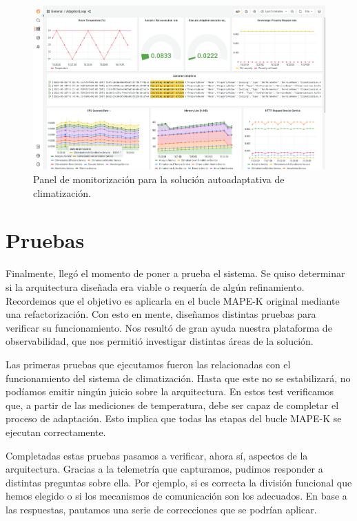 \begin{landscape}

  \begin{figure}[htb]
    \centering
    \includegraphics[scale=0.37]{cap_despliegue/images/Grafana-panel-monitorizacion}
    \caption{Panel de monitorización para la solución autoadaptativa de climatización.}
    \label{fig:grafana-panel-monitorizacion}
  \end{figure}

\end{landscape}


\section{Pruebas}

Finalmente, llegó el momento de poner a prueba el sistema. Se quiso determinar si la arquitectura diseñada era viable o requería de algún refinamiento. Recordemos que el objetivo es aplicarla en el bucle MAPE-K  original mediante una refactorización. Con esto en mente, diseñamos distintas pruebas para verificar su funcionamiento. Nos resultó de gran ayuda nuestra plataforma de observabilidad, que nos permitió investigar distintas áreas de la solución.

Las primeras pruebas que ejecutamos fueron las relacionadas con el funcionamiento del sistema de climatización. Hasta que este no se estabilizará, no podíamos emitir ningún juicio sobre la arquitectura. En estos test verificamos que, a partir de las mediciones de temperatura, debe ser capaz de completar el proceso de adaptación. Esto implica que todas las etapas del bucle MAPE-K se ejecutan correctamente.

Completadas estas pruebas pasamos a verificar, ahora sí, aspectos de la arquitectura. Gracias a la telemetría que capturamos, pudimos responder a distintas preguntas sobre ella. Por ejemplo, si es correcta la división funcional que hemos elegido o si los mecanismos de comunicación son los adecuados. En base a las respuestas, pautamos una serie de correcciones que se podrían aplicar.

